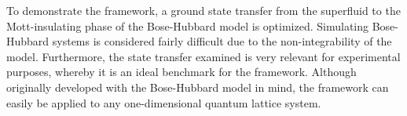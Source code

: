 To demonstrate the framework, a ground state transfer from the superfluid to the Mott-insulating phase of the Bose-Hubbard model is optimized. Simulating Bose-Hubbard systems is considered fairly difficult due to the non-integrability of the model. Furthermore, the state transfer examined is very relevant for experimental purposes, whereby it is an ideal benchmark for the framework. Although originally developed with the Bose-Hubbard model in mind, the framework can easily be applied to any one-dimensional quantum lattice system. 

